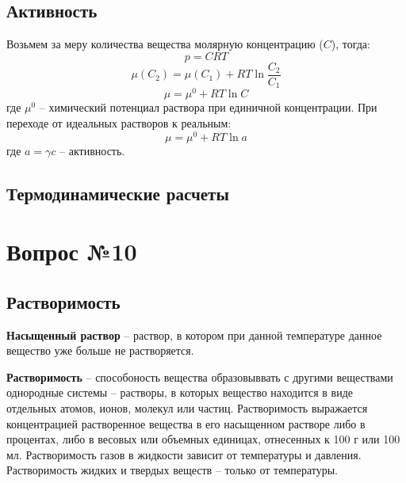 \documentclass[14pt,a4paper]{scrartcl}
\begin{document}
	\subsection*{Активность} 
	Возьмем за меру количества вещества молярную концентрацию ($C$), тогда:
	$$ p=CRT $$
	\[
	\mu (C_2) = \mu(C_1) + RT \ln{\dfrac{C_2}{C_1}}	
	\]
	\[
	\mu = \mu^0 + RT \ln{C}
	\]
	где $\mu^0$ -- химический потенциал раствора при единичной концентрации.
	При переходе от идеальных растворов к реальным:
	\[
	\mu = \mu^0 + RT \ln{a}
	\]
	где $a = \gamma c$ -- активность. 
	\subsection*{Термодинамические расчеты} 
	
\section*{Вопрос №10}
\subsection*{Растворимость}
\textbf{Насыщенный раствор} – раствор, в котором при данной температуре данное вещество уже больше не растворяется.

\textbf{Растворимость} – способоность вещества образовыввать с другими веществами однородные системы – растворы, в которых вещество находится в виде отдельных атомов, ионов, молекул или частиц. Растворимость выражается концентрацией растворенное вещества в его насыщенном растворе либо в процентах, либо в весовых или объемных единицах, отнесенных к 100 г или 100 мл. Растворимость газов в жидкости зависит от температуры и давления.  Растворимость жидких и твердых веществ – только от температуры.
\end{document}
